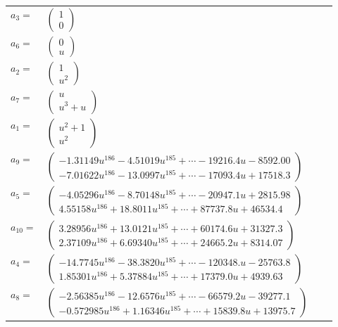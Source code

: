 \documentclass[1p]{elsarticle_modified}
\theoremstyle{definition}
\begin{document}
\begin{tabular}{m{7pt} m{180pt} m{7pt} m{180pt} }
\flushright $a_{3}=$&$\begin{pmatrix}1\\0\end{pmatrix}$ \\
\flushright $a_{6}=$&$\begin{pmatrix}0\\u\end{pmatrix}$ \\
\flushright $a_{2}=$&$\begin{pmatrix}1\\u^2\end{pmatrix}$ \\
\flushright $a_{7}=$&$\begin{pmatrix}u\\u^3+u\end{pmatrix}$ \\
\flushright $a_{1}=$&$\begin{pmatrix}u^2+1\\u^2\end{pmatrix}$ \\
\flushright $a_{9}=$&$\begin{pmatrix}-1.31149 u^{186}-4.51019 u^{185}+\cdots-19216.4 u-8592.00\\-7.01622 u^{186}-13.0997 u^{185}+\cdots-17093.4 u+17518.3\end{pmatrix}$ \\
\flushright $a_{5}=$&$\begin{pmatrix}-4.05296 u^{186}-8.70148 u^{185}+\cdots-20947.1 u+2815.98\\4.55158 u^{186}+18.8011 u^{185}+\cdots+87737.8 u+46534.4\end{pmatrix}$ \\
\flushright $a_{10}=$&$\begin{pmatrix}3.28956 u^{186}+13.0121 u^{185}+\cdots+60174.6 u+31327.3\\2.37109 u^{186}+6.69340 u^{185}+\cdots+24665.2 u+8314.07\end{pmatrix}$ \\
\flushright $a_{4}=$&$\begin{pmatrix}-14.7745 u^{186}-38.3820 u^{185}+\cdots-120348. u-25763.8\\1.85301 u^{186}+5.37884 u^{185}+\cdots+17379.0 u+4939.63\end{pmatrix}$ \\
\flushright $a_{8}=$&$\begin{pmatrix}-2.56385 u^{186}-12.6576 u^{185}+\cdots-66579.2 u-39277.1\\-0.572985 u^{186}+1.16346 u^{185}+\cdots+15839.8 u+13975.7\end{pmatrix}$ \\

\end{tabular}
\end{document}
